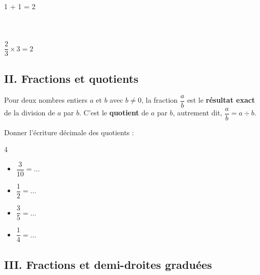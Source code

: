 \begin{Exemple}
\begin{minipage}[c]{0.8\textwidth}
\begin{center}
\end{center}
\end{minipage} \hfill
\begin{minipage}[c]{0.2\textwidth}
\begin{center}
1 + 1 = 2 \\
$ $ \\
$ $ \\
$ $ \\
$ \dfrac{2}{3} \times 3 = 2 $
\end{center}
\end{minipage}

\end{Exemple}

\subsection*{II. Fractions et quotients}


\begin{Propriété}
Pour deux nombres entiers $a$ et $b$ avec $b \neq 0$, la fraction $\dfrac{a}{b}$ est le \textbf{résultat exact} de la division de $a$ par $b$. C'est le \textbf{quotient} de $a$ par $b$, autrement dit, $\dfrac{a}{b} = a \div b$.
\end{Propriété}

\begin{Exemples}
Donner l'écriture décimale des quotients : 
\vspace{-0.5cm}
\begin{multicols}{4}
\begin{itemize}
\item $\dfrac{3}{10} = \ldots$
\item $\dfrac{1}{2} = \ldots$
\item $\dfrac{3}{5} = \ldots$
\item $\dfrac{1}{4} = \ldots$
\end{itemize}
\end{multicols}
\end{Exemples}

\subsection*{III. Fractions et demi-droites graduées}

